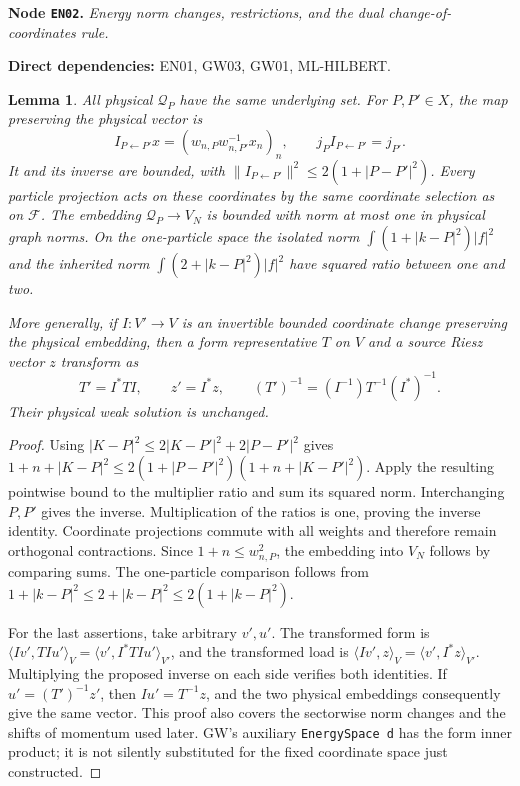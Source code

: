 \documentclass[11pt,a4paper]{article}
\newtheorem{lemma}[theorem]{Lemma}
\theoremstyle{remark}\newtheorem{remark}[theorem]{Remark}
\newcommand{\F}{\mathcal F}\newcommand{\Q}{\mathcal Q}\newcommand{\HH}{\mathcal H}
\newcommand{\node}[3]{\par\Needspace{6\baselineskip}\smallskip\hypertarget{node:#1}{}\label{nodepage:#1}\noindent\textbf{Node \texttt{#1}.} \textit{#2.}\par\noindent\textbf{Direct dependencies:} #3.\par}
\begin{document}
\node{EN02}{Energy norm changes, restrictions, and the dual change-of-coordinates rule}{EN01, GW03, GW01, ML-HILBERT}
\begin{lemma}\label{lem:energytransport}
All physical $\Q_P$ have the same underlying set. For $P,P'\in X$, the map preserving the physical vector is
\[
 I_{P\leftarrow P'}x=(w_{n,P}w_{n,P'}^{-1}x_n)_n,
 \qquad j_PI_{P\leftarrow P'}=j_{P'}.
\]
It and its inverse are bounded, with
$\|I_{P\leftarrow P'}\|^2\leq2(1+|P-P'|^2)$.
Every particle projection acts on these coordinates by the same coordinate selection as on $\F$. The embedding $\Q_P\to V_N$ is bounded with norm at most one in physical graph norms. On the one-particle space the isolated norm $\int(1+|k-P|^2)|f|^2$ and the inherited norm $\int(2+|k-P|^2)|f|^2$ have squared ratio between one and two.

More generally, if $I:V'\to V$ is an invertible bounded coordinate change preserving the physical embedding, then a form representative $T$ on $V$ and a source Riesz vector $z$ transform as
\[
 T'=I^*TI,\qquad z'=I^*z,\qquad
 (T')^{-1}=(I^{-1})T^{-1}(I^*)^{-1}.
\]
Their physical weak solution is unchanged.
\end{lemma}
\begin{proof}
Using $|K-P|^2\leq2|K-P'|^2+2|P-P'|^2$ gives
$1+n+|K-P|^2\leq2(1+|P-P'|^2)(1+n+|K-P'|^2)$.
Apply the resulting pointwise bound to the multiplier ratio and sum its squared norm. Interchanging $P,P'$ gives the inverse. Multiplication of the ratios is one, proving the inverse identity. Coordinate projections commute with all weights and therefore remain orthogonal contractions. Since $1+n\leq w_{n,P}^2$, the embedding into $V_N$ follows by comparing sums. The one-particle comparison follows from $1+|k-P|^2\leq2+|k-P|^2\leq2(1+|k-P|^2)$.

For the last assertions, take arbitrary $v',u'$. The transformed form is
$\langle Iv',TIu'\rangle_V=\langle v',I^*TIu'\rangle_{V'}$,
and the transformed load is $\langle Iv',z\rangle_V=\langle v',I^*z\rangle_{V'}$. Multiplying the proposed inverse on each side verifies both identities. If $u'= (T')^{-1}z'$, then $Iu'=T^{-1}z$, and the two physical embeddings consequently give the same vector. This proof also covers the sectorwise norm changes and the shifts of momentum used later. GW's auxiliary \texttt{EnergySpace d} has the form inner product; it is not silently substituted for the fixed coordinate space just constructed.
\end{proof}
\end{document}
